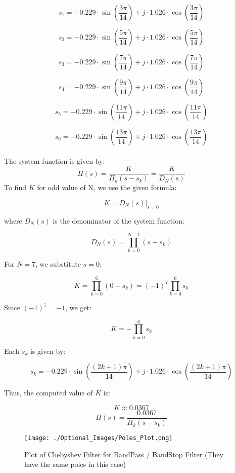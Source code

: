 \documentclass{article}
\begin{document}
\[
s_1 = -0.229\cdot \sin\left(\frac{3\pi}{14}\right) + j\cdot 1.026\cdot \cos\left(\frac{3\pi}{14}\right)
\]

\[
s_2 = -0.229\cdot \sin\left(\frac{5\pi}{14}\right) + j\cdot 1.026\cdot \cos\left(\frac{5\pi}{14}\right)
\]

\[
s_3 = -0.229\cdot \sin\left(\frac{7\pi}{14}\right) + j\cdot 1.026\cdot \cos\left(\frac{7\pi}{14}\right)
\]

\[
s_4 = -0.229\cdot \sin\left(\frac{9\pi}{14}\right) + j\cdot 1.026\cdot \cos\left(\frac{9\pi}{14}\right)
\]

\[
s_5 = -0.229\cdot \sin\left(\frac{11\pi}{14}\right) + j\cdot 1.026\cdot \cos\left(\frac{11\pi}{14}\right)
\]

\[
s_6 = -0.229\cdot \sin\left(\frac{13\pi}{14}\right) + j\cdot 1.026\cdot \cos\left(\frac{13\pi}{14}\right)
\]
\\
The system function is given by:
\[
    H(s) = \frac{K}{\Pi_{k} (s-s_k)} = \frac{K}{D_N(s)}
\]
To find \( K \) for odd value of N, we use the given formula:

\[
K = D_N(s) \Big|_{s=0}
\]

where \( D_N(s) \) is the denominator of the system function:

\[
D_N(s) = \prod_{k=0}^{N-1} (s - s_k)
\]

For \( N = 7 \), we substitute \( s = 0 \):

\[
K = \prod_{k=0}^{6} (0 - s_k) = (-1)^7 \prod_{k=0}^{6} s_k
\]

Since \( (-1)^7 = -1 \), we get:

\[
K = - \prod_{k=0}^{6} s_k
\]

Each \( s_k \) is given by:

\[
s_k = -0.229\cdot \sin\left(\frac{(2k+1)\pi}{14}\right) + j\cdot 1.026\cdot \cos\left(\frac{(2k+1)\pi}{14}\right)
\]

Thus, the computed value of \( K \) is:

\[
K \approx 0.0367
\]
\[
    H(s) = \frac{0.0367}{\Pi_k(s-s_k)}
\]

\newpage
\begin{figure}[h!]
    \centering
    \texttt{[image: ./Optional\_Images/Poles\_Plot.png]}
    \caption{Plot of Chebyshev Filter for BandPass / BandStop Filter (They have the same poles in this case)}
    \label{fig:enter-label}
\end{figure}
\end{document}
